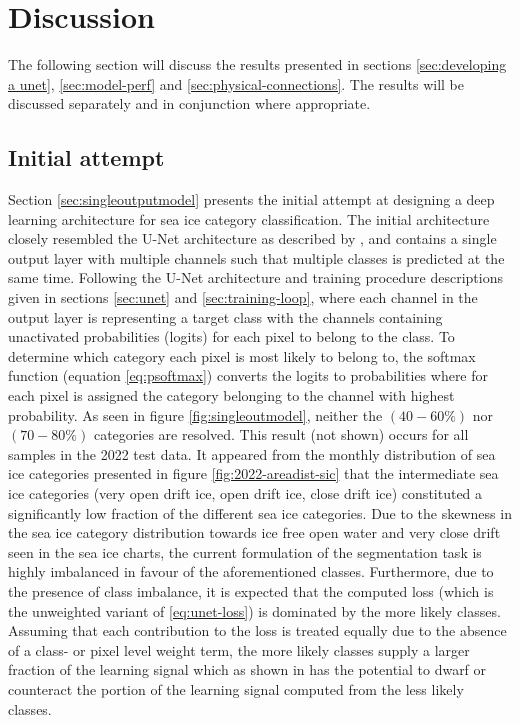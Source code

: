 \documentclass[../main/thesis]{subfiles}
\begin{document}
\section{Discussion}
The following section will discuss the results presented in sections \ref{sec:developing a unet}, \ref{sec:model-perf} and \ref{sec:physical-connections}. The results will be discussed separately and in conjunction where appropriate.

\subsection{Initial attempt}
\label{sec:multiclass-intitial}
Section \ref{sec:singleoutputmodel} presents the initial attempt at designing a deep learning architecture for sea ice category classification. The initial architecture closely resembled the U-Net architecture as described by \citet{Ronneberger2015}, and contains a single output layer with multiple channels such that multiple classes is predicted at the same time. Following the U-Net architecture and training procedure descriptions given in sections \ref{sec:unet} and \ref{sec:training-loop}, where each channel in the output layer is representing a target class with the channels containing unactivated probabilities (logits) for each pixel to belong to the class. To determine which category each pixel is most likely to belong to, the softmax function (equation \ref{eq:psoftmax}) converts the logits to probabilities where for each pixel is assigned the category belonging to the channel with highest probability. As seen in figure \ref{fig:singleoutmodel}, neither the $(40 - 60\%)$ nor $(70 - 80\%)$ categories are resolved. This result (not shown) occurs for all samples in the 2022 test data. It appeared from the monthly distribution of sea ice categories presented in figure \ref{fig:2022-areadist-sic} that the intermediate sea ice categories (very open drift ice, open drift ice, close drift ice) constituted a significantly low fraction of the different sea ice categories. Due to the skewness in the sea ice category distribution towards ice free open water and very close drift seen in the sea ice charts, the current formulation of the segmentation task is highly imbalanced in favour of the aforementioned classes. Furthermore, due to the presence of class imbalance, it is expected that the computed loss (which is the unweighted variant of \ref{eq:unet-loss}) is dominated by the more likely classes. Assuming that each contribution to the loss is treated equally due to the absence of a class- or pixel level weight term, the more likely classes supply a larger fraction of the learning signal which as shown in \citet{Lin2017} has the potential to dwarf or counteract the portion of the learning signal computed from the less likely classes.
\end{document}
